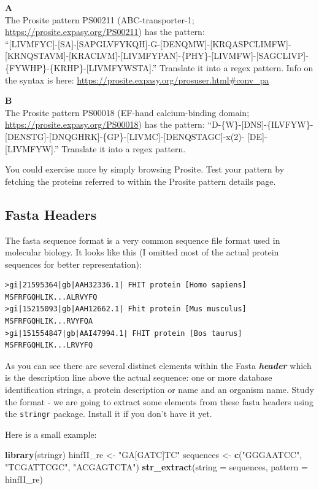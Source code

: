 \documentclass[]{book}
\newenvironment{Shaded}{\begin{snugshade}}{\end{snugshade}}
\newcommand{\DataTypeTok}[1]{\textcolor[rgb]{0.13,0.29,0.53}{#1}}
\newcommand{\KeywordTok}[1]{\textcolor[rgb]{0.13,0.29,0.53}{\textbf{#1}}}
\newcommand{\NormalTok}[1]{#1}
\newcommand{\StringTok}[1]{\textcolor[rgb]{0.31,0.60,0.02}{#1}}
\begin{document}
\textbf{A}\\
The Prosite pattern PS00211 (ABC-transporter-1; \url{https://prosite.expasy.org/PS00211}) has the pattern:\\
``{[}LIVMFYC{]}-{[}SA{]}-{[}SAPGLVFYKQH{]}-G-{[}DENQMW{]}-{[}KRQASPCLIMFW{]}-{[}KRNQSTAVM{]}-{[}KRACLVM{]}-{[}LIVMFYPAN{]}-\{PHY\}-{[}LIVMFW{]}-{[}SAGCLIVP{]}-\{FYWHP\}-\{KRHP\}-{[}LIVMFYWSTA{]}.''
Translate it into a regex pattern. Info on the syntax is here: \url{https://prosite.expasy.org/prosuser.html\#conv_pa}

\textbf{B}\\
The Prosite pattern PS00018 (EF-hand calcium-binding domain; \url{https://prosite.expasy.org/PS00018}) has the pattern:
``D-\{W\}-{[}DNS{]}-\{ILVFYW\}-{[}DENSTG{]}-{[}DNQGHRK{]}-\{GP\}-{[}LIVMC{]}-{[}DENQSTAGC{]}-x(2)- {[}DE{]}-{[}LIVMFYW{]}.''
Translate it into a regex pattern.

You could exercise more by simply browsing Prosite. Test your pattern by fetching the proteins referred to within the Prosite pattern details page.

\hypertarget{fasta-headers}{%
\subsection{Fasta Headers}\label{fasta-headers}}

The fasta sequence format is a very common sequence file format used in molecular biology.
It looks like this (I omitted most of the actual protein sequences for better representation):

\begin{verbatim}
>gi|21595364|gb|AAH32336.1| FHIT protein [Homo sapiens]
MSFRFGQHLIK...ALRVYFQ
>gi|15215093|gb|AAH12662.1| Fhit protein [Mus musculus]
MSFRFGQHLIK...RVYFQA
>gi|151554847|gb|AAI47994.1| FHIT protein [Bos taurus]
MSFRFGQHLIK...LRVYFQ
\end{verbatim}

As you can see there are several distinct elements within the Fasta \textbf{\emph{header}} which is the description line above the actual sequence: one or more database identification strings, a protein description or name and an organism name. Study the format - we are going to extract some elements from these fasta headers using the \texttt{stringr} package. Install it if you don't have it yet.

Here is a small example:

\begin{Shaded}
\begin{Highlighting}[]
\KeywordTok{library}\NormalTok{(stringr)}
\NormalTok{hinfII_re <-}\StringTok{ "GA[GATC]TC"}
\NormalTok{sequences <-}\StringTok{ }\KeywordTok{c}\NormalTok{(}\StringTok{"GGGAATCC"}\NormalTok{, }\StringTok{"TCGATTCGC"}\NormalTok{, }\StringTok{"ACGAGTCTA"}\NormalTok{)}
\KeywordTok{str_extract}\NormalTok{(}\DataTypeTok{string =}\NormalTok{ sequences,}
            \DataTypeTok{pattern =}\NormalTok{ hinfII_re)}
\end{Highlighting}
\end{Shaded}
\end{document}
